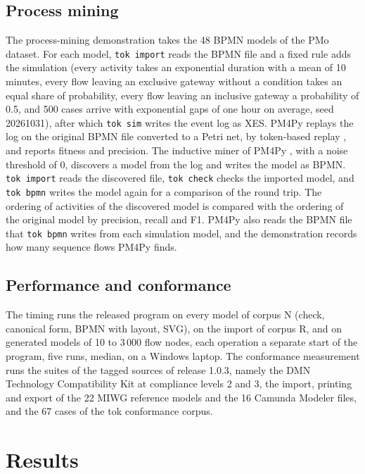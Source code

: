 \documentclass[11pt,a4paper]{article}
\begin{document}
\subsection{Process mining}

The process-mining demonstration takes the 48 BPMN models of the PMo dataset. For each model, \texttt{tok import} reads the BPMN file and a fixed rule adds the simulation (every activity takes an exponential duration with a mean of 10 minutes, every flow leaving an exclusive gateway without a condition takes an equal share of probability, every flow leaving an inclusive gateway a probability of 0.5, and 500 cases arrive with exponential gaps of one hour on average, seed 20261031), after which \texttt{tok sim} writes the event log as XES. PM4Py replays the log on the original BPMN file converted to a Petri net, by token-based replay \citep{Berti2021tbr}, and reports fitness and precision. The inductive miner of PM4Py \citep{Leemans2013}, with a noise threshold of 0, discovers a model from the log and writes the model as BPMN. \texttt{tok import} reads the discovered file, \texttt{tok check} checks the imported model, and \texttt{tok bpmn} writes the model again for a comparison of the round trip. The ordering of activities of the discovered model is compared with the ordering of the original model by precision, recall and F1. PM4Py also reads the BPMN file that \texttt{tok bpmn} writes from each simulation model, and the demonstration records how many sequence flows PM4Py finds.

\subsection{Performance and conformance}

The timing runs the released program on every model of corpus N (check, canonical form, BPMN with layout, SVG), on the import of corpus R, and on generated models of 10 to 3\,000 flow nodes, each operation a separate start of the program, five runs, median, on a Windows laptop. The conformance measurement runs the suites of the tagged sources of release 1.0.3, namely the DMN Technology Compatibility Kit at compliance levels 2 and 3, the import, printing and export of the 22 MIWG reference models and the 16 Camunda Modeler files, and the 67 cases of the tok conformance corpus.

\section{Results}\label{sec:results}
\end{document}
